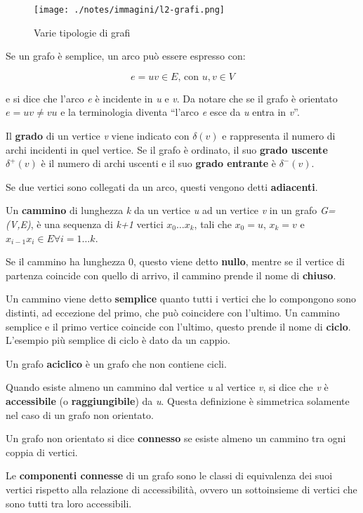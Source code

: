 \begin{figure}[htbp]
\centering
\texttt{[image: ./notes/immagini/l2-grafi.png]}
\caption{Varie tipologie di grafi}
\end{figure}

Se un grafo è semplice, un arco può essere espresso con:

$$
e = uv \in E \text{, con } u,v \in V
$$

e si dice che l'arco \emph{e} è incidente in \emph{u} e \emph{v}. Da
notare che se il grafo è orientato
$e = uv \neq vu$ e la terminologia diventa
``l'arco \emph{e} esce da \emph{u} entra in \emph{v}''.

Il \textbf{grado} di un vertice \emph{v} viene indicato con $\delta(v)$ e rappresenta il numero di archi incidenti in quel
vertice. Se il grafo è ordinato, il suo \textbf{grado uscente} $\delta^+(v)$ è il numero di archi uscenti e il suo \textbf{grado entrante} è $\delta^-(v)$.

Se due vertici sono collegati da un arco, questi vengono detti
\textbf{adiacenti}.

Un \textbf{cammino} di lunghezza \emph{k} da un vertice \emph{u} ad un
vertice \emph{v} in un grafo \emph{G=(V,E)}, è una sequenza di
\emph{k+1} vertici $x_0 \ldots x_k$, tali che $x_0 = u$, $x_k = v$ e $x_{i-1}x_i \in E \forall i = 1\ldots k$.

Se il cammino ha lunghezza 0, questo viene detto \textbf{nullo}, mentre
se il vertice di partenza coincide con quello di arrivo, il cammino
prende il nome di \textbf{chiuso}.

Un cammino viene detto \textbf{semplice} quanto tutti i vertici che lo
compongono sono distinti, ad eccezione del primo, che può coincidere
con l'ultimo. Un cammino semplice e il primo vertice coincide con
l'ultimo, questo prende il nome di \textbf{ciclo}. L'esempio più
semplice di ciclo è dato da un cappio.

Un grafo \textbf{aciclico} è un grafo che non contiene cicli.

Quando esiste almeno un cammino dal vertice \emph{u} al vertice
\emph{v}, si dice che \emph{v} è \textbf{accessibile} (o
\textbf{raggiungibile}) da \emph{u}. Questa definizione è simmetrica
solamente nel caso di un grafo non orientato.

Un grafo non orientato si dice \textbf{connesso} se esiste almeno un
cammino tra ogni coppia di vertici.

Le \textbf{componenti connesse} di un grafo sono le classi di
equivalenza dei suoi vertici rispetto alla relazione di accessibilità,
ovvero un sottoinsieme di vertici che sono tutti tra loro accessibili.

